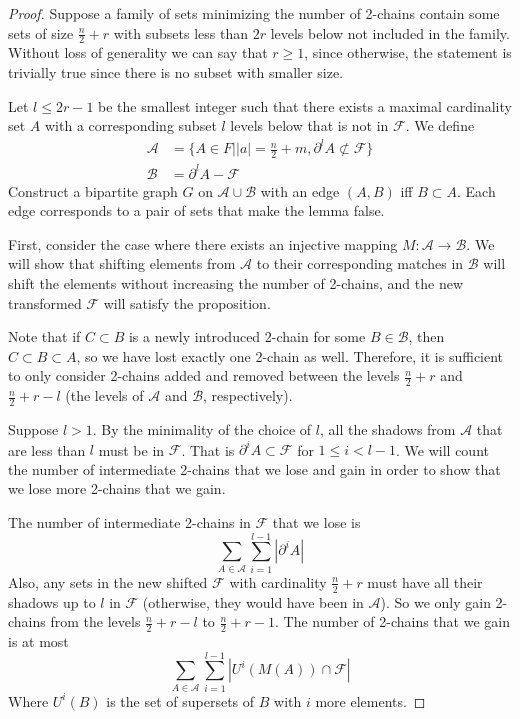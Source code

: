 \documentclass[12pt]{article}
\theoremstyle{plain}
\theoremstyle{definition}
\theoremstyle{remark}
\newcommand{\F}{\mathcal{F}}
\newcommand{\A}{\mathcal{A}}
\newcommand{\B}{\mathcal{B}}
\begin{document}
\begin{proof} Suppose a family of sets minimizing the number of 2-chains contain some sets of size $\frac{n}{2} + r$ with subsets less than $2r$ levels below not included in the family. Without loss of generality we can say that $r \geq 1$, since otherwise, the statement is trivially true since there is no subset with smaller size. 

Let $l \leq 2r-1$ be the smallest integer such that there exists a maximal cardinality set $A$ with a corresponding subset $l$ levels below that is not in $\F$. We define
\begin{align*}
\A &= \{A \in F| \lvert a \rvert = \frac{n}{2}+m, \partial^l A \not\subset \F \}\\
\B &= \partial^l A - \F
\end{align*}
Construct a bipartite graph $G$ on $\A \cup \B$ with an edge $(A,B)$ iff $B \subset A$. Each edge corresponds to a pair of sets that make the lemma false.

First, consider the case where there exists an injective mapping $M: \A \to \B$. We will show that shifting elements from $\A$ to their corresponding matches in $\B$ will shift the elements without increasing the number of 2-chains, and the new transformed $\F$ will satisfy the proposition.

Note that if $C \subset B$ is a newly introduced 2-chain for some $B \in \B$, then $C \subset B \subset A$, so we have lost exactly one 2-chain as well. Therefore, it is sufficient to only consider 2-chains added and removed between the levels $\frac{n}{2} + r$ and $\frac{n}{2} + r - l$ (the levels of $\A$ and $\B$, respectively).

Suppose $l > 1$. By the minimality of the choice of $l$, all the shadows from $\A$ that are less than $l$ must be in $\F$. That is $\partial^i A \subset \F$ for $1 \leq i < l -1$. We will count the number of intermediate 2-chains that we lose and gain in order to show that we lose more 2-chains that we gain.

The number of intermediate 2-chains in $\F$ that we lose is
\[ \sum_{A \in \A}\sum_{i = 1}^{l-1} |\partial^i A | \]
Also, any sets in the new shifted $\F$ with cardinality $\frac{n}{2} + r$ must have all their shadows up to $l$ in $\F$ (otherwise, they would have been in $\A$). So we only gain 2-chains from the levels $\frac{n}{2} + r - l$ to $\frac{n}{2} + r - 1$. The number of 2-chains that we gain is at most
\[\sum_{A\in \A}\sum_{i = 1}^{l-1} |U^i(M(A)) \cap \F| \]
Where $U^i(B)$ is the set of supersets of $B$ with $i$ more elements.


\end{proof}
\end{document}
